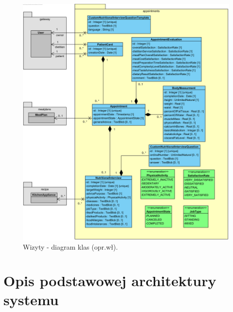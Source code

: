 \begin{minipage}{\textwidth}
    \begin{figure}[H]
        \centering\includegraphics[scale=0.7]{../uml/class_diagrams/appointments.png}
        \caption{Wizyty - diagram klas (opr.wł).}\label{rysunek:class-diagram-appointments}
    \end{figure}
\end{minipage}

\section{Opis podstawowej architektury systemu}

\thispagestyle{normal}
